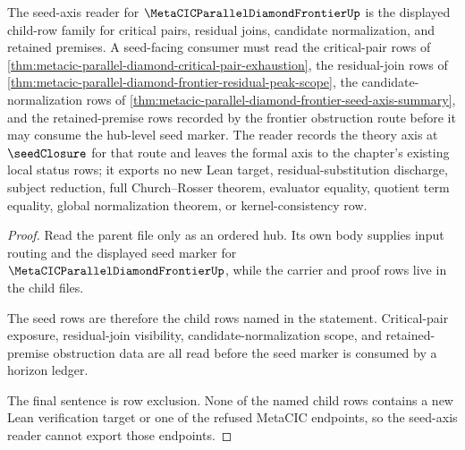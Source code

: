 \begin{theorem}
\label{thm:metacic-parallel-diamond-frontier-seed-axis-review-status}
The seed-axis reader for $\MetaCICParallelDiamondFrontierUp$ is the displayed child-row family for critical pairs, residual joins, candidate normalization, and retained premises. A seed-facing consumer must read the critical-pair rows of \autoref{thm:metacic-parallel-diamond-critical-pair-exhaustion}, the residual-join rows of \autoref{thm:metacic-parallel-diamond-frontier-residual-peak-scope}, the candidate-normalization rows of \autoref{thm:metacic-parallel-diamond-frontier-seed-axis-summary}, and the retained-premise rows recorded by the frontier obstruction route before it may consume the hub-level seed marker. The reader records the theory axis at $\seedClosure$ for that route and leaves the formal axis to the chapter's existing local status rows; it exports no new Lean target, residual-substitution discharge, subject reduction, full Church--Rosser theorem, evaluator equality, quotient term equality, global normalization theorem, or kernel-consistency row.
\end{theorem}
\begin{proof}
Read the parent file only as an ordered hub. Its own body supplies input routing and the displayed seed marker for $\MetaCICParallelDiamondFrontierUp$, while the carrier and proof rows live in the child files.

The seed rows are therefore the child rows named in the statement. Critical-pair exposure, residual-join visibility, candidate-normalization scope, and retained-premise obstruction data are all read before the seed marker is consumed by a horizon ledger.

The final sentence is row exclusion. None of the named child rows contains a new Lean verification target or one of the refused MetaCIC endpoints, so the seed-axis reader cannot export those endpoints.
\end{proof}
